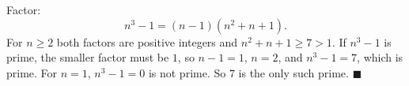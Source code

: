 Factor:
\[
n^3-1=(n-1)\left(n^2+n+1\right).
\]
For $n\ge2$ both factors are positive integers and $n^2+n+1\ge7>1$. If $n^3-1$ is prime, the smaller factor must be $1$, so $n-1=1$, $n=2$, and $n^3-1=7$, which is prime. For $n=1$, $n^3-1=0$ is not prime. So $7$ is the only such prime. $\blacksquare$
